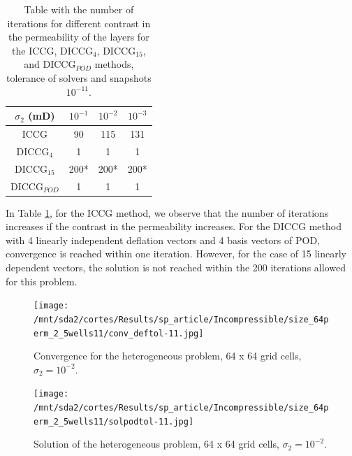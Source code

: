 \documentclass[12pt]{article}
\begin{document}
\renewcommand{\arraystretch}{1.3}
\begin{table}[H]\centering
\begin{minipage}{.8\textwidth}
\vspace{-10pt}
\centering
\begin{tabular}{ |c|c|c|c|} 
\hline
 $\sigma_2$ (mD) & $10^{-1}$& $10^{-2}$ & $10^{-3}$ \\
 \hline
  ICCG  & 90& 115&131\\ 
 
  DICCG$_4$  & 1 & 1& 1\\ 
  DICCG$_{15}$  & 200* & 200*& 200*\\
  DICCG$_{POD}$  & 1 & 1& 1\\
 \hline
\end{tabular}
\caption{Table with the number of iterations for different contrast in the permeability of the layers
for the ICCG, DICCG$_4$, DICCG$_{15}$, and DICCG$_{POD}$ methods, tolerance of solvers and snapshots $10^{-11}$.}
\label{table:he22}\end{minipage}
\vspace{-10pt}
\end{table}

In Table \ref{table:he22}, for the ICCG method, we observe that the number of iterations 
increases if the contrast in the permeability increases. For the DICCG method with 4 linearly independent deflation vectors and 4 basis vectors of POD, convergence is reached 
within one iteration. However, for the case of 15 linearly dependent vectors, the solution is not reached within the 200 iterations allowed for this problem.\\

\vspace{-5mm}
\begin{figure}[!h]
\centering
\begin{minipage}{.4\textwidth}
 \centering
\texttt{[image: /mnt/sda2/cortes/Results/sp\_article/Incompressible/size\_64perm\_2\_5wells11/conv\_deftol-11.jpg]}
\caption{Convergence for the heterogeneous problem, 64 x 64 grid cells, $\sigma_2=10^{-2}$.}
\label{fig:convhe2}
\end{minipage}%
\hspace{10 pt}
\begin{minipage}{.4\textwidth}
 \centering
\texttt{[image: /mnt/sda2/cortes/Results/sp\_article/Incompressible/size\_64perm\_2\_5wells11/solpodtol-11.jpg]}
\vspace{0.5cm}
\caption{Solution of the heterogeneous problem, 64 x 64 grid cells, $\sigma_2=10^{-2}$.}
\label{fig:solhe2}
\end{minipage}
\end{figure}
\end{document}
